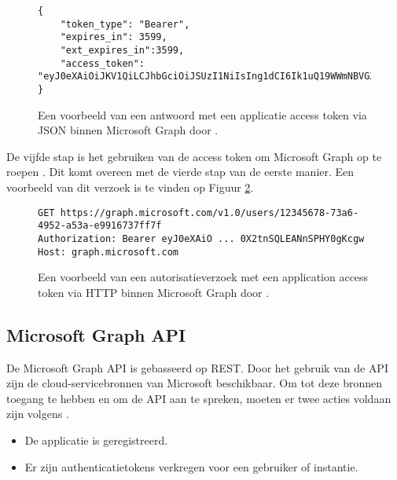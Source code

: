 \begin{figure}[!h]
    \scriptsize
    \begin{verbatim}
{
    "token_type": "Bearer",
    "expires_in": 3599,
    "ext_expires_in":3599,
    "access_token": "eyJ0eXAiOiJKV1QiLCJhbGciOiJSUzI1NiIsIng1dCI6Ik1uQ19WWmNBVGZNNXBP..."
} 
    \end{verbatim}    
    \caption[Voorbeeld Application Token Response Microsoft Graph]{Een voorbeeld van een antwoord met een applicatie access token via \ac{JSON} binnen Microsoft Graph door \textcite{Microsoft2023s}.}
    \label{MSGATRRES}
\end{figure}

De vijfde stap is het gebruiken van de access token om Microsoft Graph op te roepen \autocite{Microsoft2023s}. Dit komt overeen met de vierde stap van de eerste manier. Een voorbeeld van dit verzoek is te vinden op Figuur \ref{MSGAAT}.

\begin{figure}[!h]
    \scriptsize
    \begin{verbatim}
GET https://graph.microsoft.com/v1.0/users/12345678-73a6-4952-a53a-e9916737ff7f
Authorization: Bearer eyJ0eXAiO ... 0X2tnSQLEANnSPHY0gKcgw
Host: graph.microsoft.com
    \end{verbatim}    
    \caption[Voorbeeld Application autorisatieverzoek Microsoft Graph]{Een voorbeeld van een autorisatieverzoek met een application access token via \ac{HTTP} binnen Microsoft Graph door \textcite{Microsoft2023s}.}
    \label{MSGAAT}
\end{figure}



\subsection{Microsoft Graph API}

De Microsoft Graph \Ac{API} is gebasseerd op \Ac{REST}. Door het gebruik van de \ac{API} zijn de cloud-servicebronnen van Microsoft beschikbaar. Om tot deze bronnen toegang te hebben en om de \Ac{API} aan te spreken, moeten er twee acties voldaan zijn volgens \textcite{Microsoft2023vv}.

\begin{itemize}
    \item De applicatie is geregistreerd.
    \item Er zijn authenticatietokens verkregen voor een gebruiker of instantie.
\end{itemize}

